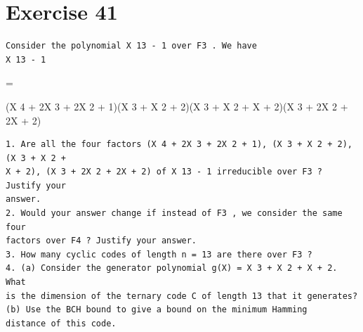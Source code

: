 \documentclass[11pt]{article}
\begin{document}
\section*{Exercise 41}
\begin{exercisebox}
\begin{Verbatim}[fontsize=\small]
Consider the polynomial X 13 - 1 over F3 . We have
X 13 - 1
\end{Verbatim}
=

(X 4 + 2X 3 + 2X 2 + 1)(X 3 + X 2 + 2)(X 3 + X 2 + X + 2)(X 3 + 2X 2 + 2X + 2)

\begin{Verbatim}[fontsize=\small]
1. Are all the four factors (X 4 + 2X 3 + 2X 2 + 1), (X 3 + X 2 + 2), (X 3 + X 2 +
X + 2), (X 3 + 2X 2 + 2X + 2) of X 13 - 1 irreducible over F3 ? Justify your
answer.
2. Would your answer change if instead of F3 , we consider the same four
factors over F4 ? Justify your answer.
3. How many cyclic codes of length n = 13 are there over F3 ?
4. (a) Consider the generator polynomial g(X) = X 3 + X 2 + X + 2. What
is the dimension of the ternary code C of length 13 that it generates?
(b) Use the BCH bound to give a bound on the minimum Hamming
distance of this code.
\end{Verbatim}
\end{exercisebox}
\end{document}
